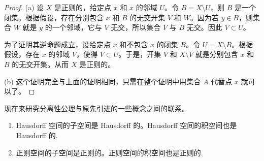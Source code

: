 \begin{proof}
(a) 设 $X$ 是正则的，给定点 $x$ 和 $x$ 的邻域 $U$。令 $B=X\setminus U$，则 $B$ 是一个闭集。根据假设，存在分别包含 $x$ 和 $B$ 的无交开集 $V$ 和 $W$。因为若 $y\in B$，则集合 $W$ 就是 $y$ 的一个邻域，它与 $V$ 无交，所以集合 $\overline{V}$ 与 $B$ 无交。因此 $\overline{V}\subset U$。

为了证明其逆命题成立，设给定点 $x$ 和不包含 $x$ 的闭集 $B$。令 $U=X\setminus B$。根据假设，存在 $x$ 的邻域 $V$，使得 $\overline{V}\subset U$。于是，开集 $V$ 和 $X\setminus\overline{V}$ 就是分别包含 $x$ 和 $B$ 的无交开集。从而 $X$ 是正则的。

(b) 这个证明完全与上面的证明相同，只需在整个证明中用集合 $A$ 代替点 $x$ 就可以了。
\end{proof}

现在来研究分离性公理与原先引进的一些概念之间的联系。

\begin{theorem}\label{theorem:ch04-hausdorff-regular-hereditary}
\begin{enumerate}
\item Hausdorff 空间的子空间是 Hausdorff 的。Hausdorff 空间的积空间也是 Hausdorff 的.
\item 正则空间的子空间是正则的。正则空间的积空间也是正则的.
\end{enumerate}
\end{theorem}

